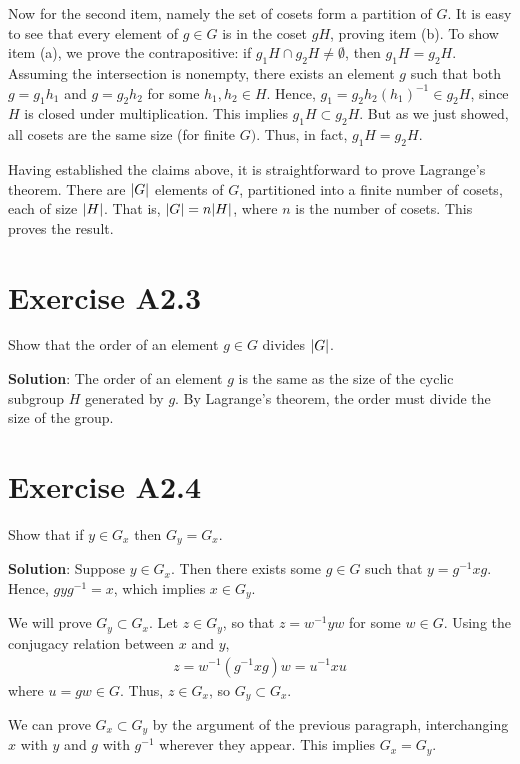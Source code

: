 \documentclass{book}
\begin{document}
    Now for the second item, namely the set of cosets form a partition of $G$. It is easy to see that every element of $g\in G$ is in the coset $gH$, proving item (b). To show item (a), we prove the contrapositive: if $g_1 H\cap g_2 H \neq \emptyset$, then $g_1 H = g_2 H$. Assuming the intersection is nonempty, there exists an element $g$ such that both $g = g_1 h_1$ and $g = g_2 h_2$ for some $h_1, h_2 \in H$. Hence, $g_1 = g_2 h_2 (h_1)^{-1} \in g_2 H$, since $H$ is closed under multiplication. This implies $g_1 H \subset g_2 H$. But as we just showed, all cosets are the same size (for finite $G)$. Thus, in fact, $g_1 H = g_2 H$.
    
    Having established the claims above, it is straightforward to prove Lagrange's theorem. There are $\abs{G}$ elements of $G$, partitioned into a finite number of cosets, each of size $\abs{H}$. That is, $\abs{G} = n\abs{H}$, where $n$ is the number of cosets. This proves the result.
    
\section*{Exercise A2.3}
    Show that the order of an element $g\in G$ divides $\abs{G}$.
    
    \textbf{Solution}: The order of an element $g$ is the same as the size of the cyclic subgroup $H$ generated by $g$. By Lagrange's theorem, the order must divide the size of the group.
    
\section*{Exercise A2.4}
    Show that if $y\in G_x$ then $G_y = G_x$.
    
    \textbf{Solution}: Suppose $y\in G_x$. Then there exists some $g\in G$ such that $y=g^{-1} x g$. Hence, $g y g^{-1} = x$, which implies $x \in G_y$. 
    
    We will prove $G_y \subset G_x$. Let $z \in G_y$, so that $z = w^{-1}y w$ for some $w\in G$. Using the conjugacy relation between $x$ and $y$,
    \begin{align}
        z = w^{-1}(g^{-1}xg)w = u^{-1}x u
    \end{align}
    where $u = gw \in G$. Thus, $z \in G_x$, so $G_y \subset G_x$.
    
    We can prove $G_x \subset G_y$ by the argument of the previous paragraph, interchanging $x$ with $y$ and $g$ with $g^{-1}$ wherever they appear. This implies $G_x = G_y$. 
\end{document}
